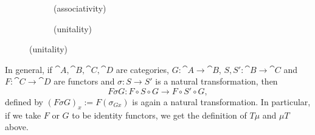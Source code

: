 \begin{definition}[monad]
\begin{figure}[H]
\centering
\begin{subfigure}{0.4\textwidth}
\centering
\caption*{(associativity)}
\end{subfigure}
\hspace{2em}
\begin{subfigure}{0.4\textwidth}
\centering
\caption*{(unitality)}
\end{subfigure}
\end{figure}

\end{definition}
\begin{remark}
    In general, if $\cat{A},\cat{B},\cat{C},\cat{D}$ are categories, 
    $G \colon \cat{A} \to \cat{B}$, $S,S' \colon \cat{B} \to \cat{C}$ and
    $F \colon \cat{C} \to \cat{D}$ are functors and
    $\sigma \colon S \to S'$ is a natural transformation,
    then 
    \[
        F \sigma G \colon F \circ S \circ G \to F \circ S' \circ G,
    \]
    defined by $(F\sigma G)_x := F(\sigma_{Gx})$
    is again a natural transformation.
    In particular, if we take $F$ or $G$ to be identity functors, we get
    the definition of $T\mu$ and $\mu T$ above.

\end{remark}
